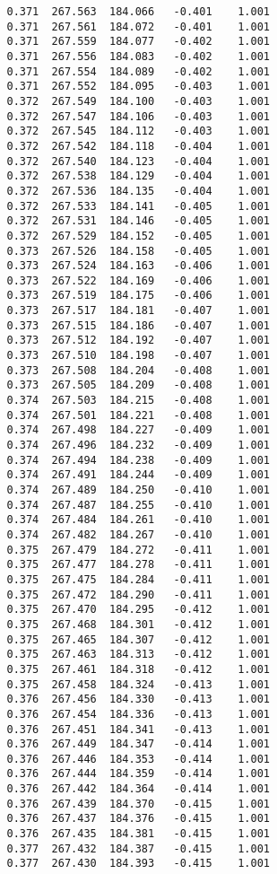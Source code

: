 \begin{verbatim}
   0.371  267.563  184.066   -0.401    1.001
   0.371  267.561  184.072   -0.401    1.001
   0.371  267.559  184.077   -0.402    1.001
   0.371  267.556  184.083   -0.402    1.001
   0.371  267.554  184.089   -0.402    1.001
   0.371  267.552  184.095   -0.403    1.001
   0.372  267.549  184.100   -0.403    1.001
   0.372  267.547  184.106   -0.403    1.001
   0.372  267.545  184.112   -0.403    1.001
   0.372  267.542  184.118   -0.404    1.001
   0.372  267.540  184.123   -0.404    1.001
   0.372  267.538  184.129   -0.404    1.001
   0.372  267.536  184.135   -0.404    1.001
   0.372  267.533  184.141   -0.405    1.001
   0.372  267.531  184.146   -0.405    1.001
   0.372  267.529  184.152   -0.405    1.001
   0.373  267.526  184.158   -0.405    1.001
   0.373  267.524  184.163   -0.406    1.001
   0.373  267.522  184.169   -0.406    1.001
   0.373  267.519  184.175   -0.406    1.001
   0.373  267.517  184.181   -0.407    1.001
   0.373  267.515  184.186   -0.407    1.001
   0.373  267.512  184.192   -0.407    1.001
   0.373  267.510  184.198   -0.407    1.001
   0.373  267.508  184.204   -0.408    1.001
   0.373  267.505  184.209   -0.408    1.001
   0.374  267.503  184.215   -0.408    1.001
   0.374  267.501  184.221   -0.408    1.001
   0.374  267.498  184.227   -0.409    1.001
   0.374  267.496  184.232   -0.409    1.001
   0.374  267.494  184.238   -0.409    1.001
   0.374  267.491  184.244   -0.409    1.001
   0.374  267.489  184.250   -0.410    1.001
   0.374  267.487  184.255   -0.410    1.001
   0.374  267.484  184.261   -0.410    1.001
   0.374  267.482  184.267   -0.410    1.001
   0.375  267.479  184.272   -0.411    1.001
   0.375  267.477  184.278   -0.411    1.001
   0.375  267.475  184.284   -0.411    1.001
   0.375  267.472  184.290   -0.411    1.001
   0.375  267.470  184.295   -0.412    1.001
   0.375  267.468  184.301   -0.412    1.001
   0.375  267.465  184.307   -0.412    1.001
   0.375  267.463  184.313   -0.412    1.001
   0.375  267.461  184.318   -0.412    1.001
   0.375  267.458  184.324   -0.413    1.001
   0.376  267.456  184.330   -0.413    1.001
   0.376  267.454  184.336   -0.413    1.001
   0.376  267.451  184.341   -0.413    1.001
   0.376  267.449  184.347   -0.414    1.001
   0.376  267.446  184.353   -0.414    1.001
   0.376  267.444  184.359   -0.414    1.001
   0.376  267.442  184.364   -0.414    1.001
   0.376  267.439  184.370   -0.415    1.001
   0.376  267.437  184.376   -0.415    1.001
   0.376  267.435  184.381   -0.415    1.001
   0.377  267.432  184.387   -0.415    1.001
   0.377  267.430  184.393   -0.415    1.001

\end{verbatim}
